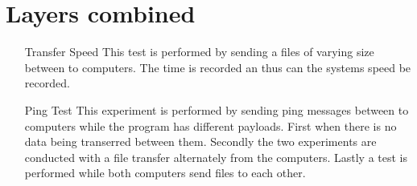 \section{Layers combined}

\begin{itemize}
\item[Transfer Speed] This test is performed by sending a files of varying size between to computers. The time is recorded an thus can the systems speed be recorded.
\item[Ping Test] This experiment is performed by sending ping messages between to computers while the program has different payloads. First when there is no data being transerred between them. Secondly the two experiments are conducted with a file transfer alternately from the computers. Lastly a test is performed while both computers send files to each other.  
\end{itemize}
